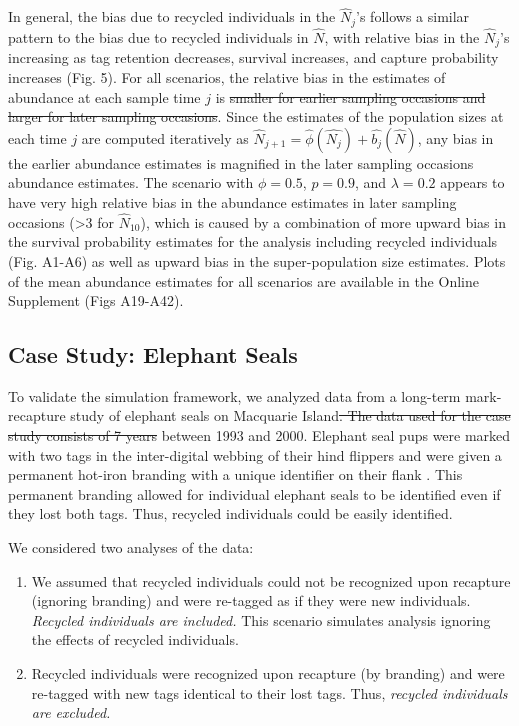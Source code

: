 \documentclass[12pt]{article}
\providecommand{\DIFaddtex}[1]{{\protect\color{blue}\uwave{#1}}} %
\providecommand{\DIFdeltex}[1]{{\protect\color{red}\sout{#1}}}                      %
\providecommand{\DIFaddbegin}{} %
\providecommand{\DIFaddend}{} %
\providecommand{\DIFdelbegin}{} %
\providecommand{\DIFdelend}{} %
\providecommand{\DIFadd}[1]{\texorpdfstring{\DIFaddtex{#1}}{#1}} %
\providecommand{\DIFdel}[1]{\texorpdfstring{\DIFdeltex{#1}}{}} %
\newcommand{\DIFscaledelfig}{0.5}
\newlength{\DIFdelgraphicswidth} %
\newlength{\DIFdelgraphicsheight} %
\newcommand{\DIFaddincludegraphics}[2][]{{\color{blue}\fbox{\DIFOincludegraphics[#1]{#2}}}} %
\newcommand{\DIFdelincludegraphics}[2][]{%
\sbox{\DIFdelgraphicsbox}{\DIFOincludegraphics[#1]{#2}}%
\settoboxwidth{\DIFdelgraphicswidth}{\DIFdelgraphicsbox} %
\settoboxtotalheight{\DIFdelgraphicsheight}{\DIFdelgraphicsbox} %
\scalebox{\DIFscaledelfig}{%
\parbox[b]{\DIFdelgraphicswidth}{\usebox{\DIFdelgraphicsbox}\\[-\baselineskip] \rule{\DIFdelgraphicswidth}{0em}}\llap{\resizebox{\DIFdelgraphicswidth}{\DIFdelgraphicsheight}{%
\setlength{\unitlength}{\DIFdelgraphicswidth}%
\begin{picture}(1,1)%
\thicklines\linethickness{2pt} %
{\color[rgb]{1,0,0}\put(0,0){\framebox(1,1){}}}%
{\color[rgb]{1,0,0}\put(0,0){\line( 1,1){1}}}%
{\color[rgb]{1,0,0}\put(0,1){\line(1,-1){1}}}%
\end{picture}%
}\hspace*{3pt}}} %
} %
\DeclareRobustCommand{\DIFaddbegin}{\DIFOaddbegin \let\includegraphics\DIFaddincludegraphics} %
\DeclareRobustCommand{\DIFaddend}{\DIFOaddend \let\includegraphics\DIFOincludegraphics} %
\DeclareRobustCommand{\DIFdelbegin}{\DIFOdelbegin \let\includegraphics\DIFdelincludegraphics} %
\DeclareRobustCommand{\DIFdelend}{\DIFOaddend \let\includegraphics\DIFOincludegraphics} %
\begin{document}
In general, the bias due to recycled individuals in the \(\hat{N}_j\)'s
follows a similar pattern to the bias due to recycled individuals in
\(\hat{N}\), with relative bias in the \(\hat{N}_j\)'s increasing as tag
retention decreases, survival increases, and capture probability
increases (Fig. 5). For all scenarios, the relative bias in the
estimates of abundance at each sample time \(j\) is \DIFdelbegin \DIFdel{smaller for earlier
sampling occasions and larger for later sampling occasions}\DIFdelend \DIFaddbegin \DIFadd{larger later in the study}\DIFaddend . Since the
estimates of the population sizes at each time \(j\) are computed
iteratively as
\(\hat{N}_{j+1}=\hat{\phi}(\hat{N_j})+\hat{b_j}(\hat{N})\), any bias in
the earlier abundance estimates is magnified in the later sampling
occasions abundance estimates. The scenario with \(\phi=0.5\),
\(p=0.9\), and \(\lambda=0.2\) appears to have very high relative bias
in the abundance estimates in later sampling occasions (\textgreater{}3
for \(\hat{N}_{10}\)), which is caused by a combination of more upward
bias in the survival probability estimates for the analysis including recycled
individuals  (Fig. A1-A6) as well as upward bias in the
super-population size estimates. Plots of the mean abundance estimates
for all scenarios are available in the Online Supplement (Figs A19-A42).

\subsection{Case Study: Elephant
Seals}\label{case-study-elephant-seals-1}


To validate the simulation framework, we analyzed \DIFaddbegin \DIFadd{seven years of }\DIFaddend data from a long-term mark-recapture study of elephant seals on Macquarie Island\DIFdelbegin \DIFdel{. The data
used for the case study consists of 7 years }\DIFdelend \DIFaddbegin \DIFadd{, Australia }\DIFaddend between 1993 and 2000. 
Elephant seal pups were marked with two tags in the inter-digital
webbing of their hind flippers and were given a permanent hot-iron
branding with a unique identifier on their flank \citep{McMahon:2009}. This
permanent branding allowed for individual elephant seals to be
identified even if they lost both tags. Thus, recycled individuals could
be easily identified.

We considered two analyses of the data:

\begin{enumerate}
\def\labelenumi{\arabic{enumi}.}
\item
  We assumed that recycled individuals could not be recognized upon
  recapture (ignoring branding) and were re-tagged as if they were new
  individuals.  \textit{ Recycled individuals are included.} This scenario simulates analysis ignoring the effects of recycled individuals. 
\item
  Recycled individuals were recognized upon recapture (by branding) and were re-tagged with new tags identical to their lost tags. Thus, \textit{recycled individuals are excluded.} 
\end{enumerate}
\end{document}
